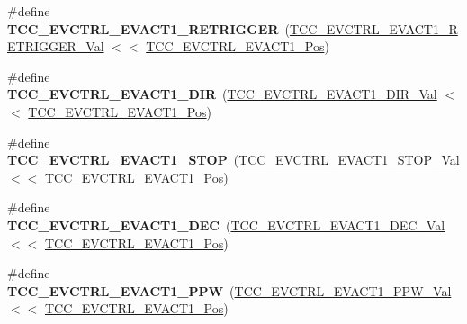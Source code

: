 \begin{DoxyCompactItemize}
\item 
\hypertarget{group___s_a_m_l21___t_c_c_ga78a9fc735f80476516152487dd8eba49}{}\#define {\bfseries T\+C\+C\+\_\+\+E\+V\+C\+T\+R\+L\+\_\+\+E\+V\+A\+C\+T1\+\_\+\+R\+E\+T\+R\+I\+G\+G\+E\+R}~(\hyperlink{group___s_a_m_l21___t_c_c_ga9d2f6884ed5da6e3248172b59236b562}{T\+C\+C\+\_\+\+E\+V\+C\+T\+R\+L\+\_\+\+E\+V\+A\+C\+T1\+\_\+\+R\+E\+T\+R\+I\+G\+G\+E\+R\+\_\+\+Val} $<$$<$ \hyperlink{group___s_a_m_l21___t_c_c_gada1f071c882b1c68121a6d6db44527e2}{T\+C\+C\+\_\+\+E\+V\+C\+T\+R\+L\+\_\+\+E\+V\+A\+C\+T1\+\_\+\+Pos})\label{group___s_a_m_l21___t_c_c_ga78a9fc735f80476516152487dd8eba49}

\item 
\hypertarget{group___s_a_m_l21___t_c_c_gaee97a6bd826921eb534d8ce1c6fd6830}{}\#define {\bfseries T\+C\+C\+\_\+\+E\+V\+C\+T\+R\+L\+\_\+\+E\+V\+A\+C\+T1\+\_\+\+D\+I\+R}~(\hyperlink{group___s_a_m_l21___t_c_c_gaa4361ca908de2ee8ebbbde80cf4df719}{T\+C\+C\+\_\+\+E\+V\+C\+T\+R\+L\+\_\+\+E\+V\+A\+C\+T1\+\_\+\+D\+I\+R\+\_\+\+Val}     $<$$<$ \hyperlink{group___s_a_m_l21___t_c_c_gada1f071c882b1c68121a6d6db44527e2}{T\+C\+C\+\_\+\+E\+V\+C\+T\+R\+L\+\_\+\+E\+V\+A\+C\+T1\+\_\+\+Pos})\label{group___s_a_m_l21___t_c_c_gaee97a6bd826921eb534d8ce1c6fd6830}

\item 
\hypertarget{group___s_a_m_l21___t_c_c_gaae8963e2694be059bab581e2d9d1907d}{}\#define {\bfseries T\+C\+C\+\_\+\+E\+V\+C\+T\+R\+L\+\_\+\+E\+V\+A\+C\+T1\+\_\+\+S\+T\+O\+P}~(\hyperlink{group___s_a_m_l21___t_c_c_ga96c6734b829a2429c9a458dc1f17f74d}{T\+C\+C\+\_\+\+E\+V\+C\+T\+R\+L\+\_\+\+E\+V\+A\+C\+T1\+\_\+\+S\+T\+O\+P\+\_\+\+Val}    $<$$<$ \hyperlink{group___s_a_m_l21___t_c_c_gada1f071c882b1c68121a6d6db44527e2}{T\+C\+C\+\_\+\+E\+V\+C\+T\+R\+L\+\_\+\+E\+V\+A\+C\+T1\+\_\+\+Pos})\label{group___s_a_m_l21___t_c_c_gaae8963e2694be059bab581e2d9d1907d}

\item 
\hypertarget{group___s_a_m_l21___t_c_c_gad813ef5ebb160c20726d8cb13b1207ca}{}\#define {\bfseries T\+C\+C\+\_\+\+E\+V\+C\+T\+R\+L\+\_\+\+E\+V\+A\+C\+T1\+\_\+\+D\+E\+C}~(\hyperlink{group___s_a_m_l21___t_c_c_ga50c7b0aee929c3320582370f406fa345}{T\+C\+C\+\_\+\+E\+V\+C\+T\+R\+L\+\_\+\+E\+V\+A\+C\+T1\+\_\+\+D\+E\+C\+\_\+\+Val}     $<$$<$ \hyperlink{group___s_a_m_l21___t_c_c_gada1f071c882b1c68121a6d6db44527e2}{T\+C\+C\+\_\+\+E\+V\+C\+T\+R\+L\+\_\+\+E\+V\+A\+C\+T1\+\_\+\+Pos})\label{group___s_a_m_l21___t_c_c_gad813ef5ebb160c20726d8cb13b1207ca}

\item 
\hypertarget{group___s_a_m_l21___t_c_c_ga80127d330f8e79b0f9c0575e920d6e77}{}\#define {\bfseries T\+C\+C\+\_\+\+E\+V\+C\+T\+R\+L\+\_\+\+E\+V\+A\+C\+T1\+\_\+\+P\+P\+W}~(\hyperlink{group___s_a_m_l21___t_c_c_gad65bf5f8cc669d5c2833e610381ede16}{T\+C\+C\+\_\+\+E\+V\+C\+T\+R\+L\+\_\+\+E\+V\+A\+C\+T1\+\_\+\+P\+P\+W\+\_\+\+Val}     $<$$<$ \hyperlink{group___s_a_m_l21___t_c_c_gada1f071c882b1c68121a6d6db44527e2}{T\+C\+C\+\_\+\+E\+V\+C\+T\+R\+L\+\_\+\+E\+V\+A\+C\+T1\+\_\+\+Pos})\label{group___s_a_m_l21___t_c_c_ga80127d330f8e79b0f9c0575e920d6e77}


\end{DoxyCompactItemize}
